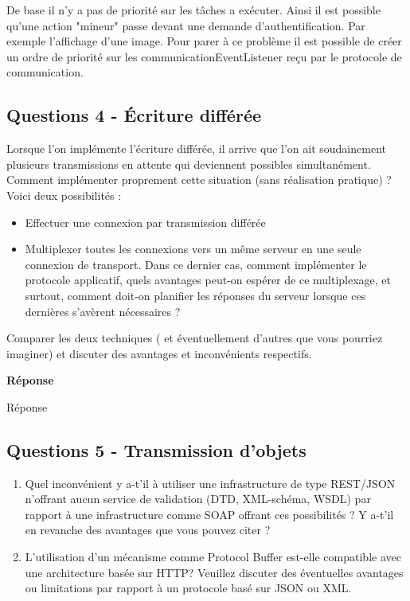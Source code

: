 \documentclass[francais,12pt]{article}
\begin{document}
	De base il n'y a pas de priorité sur les tâches a exécuter. Ainsi il est possible qu'une action "mineur" passe devant une demande d'authentification. Par exemple l'affichage d'une image. Pour parer à ce problème il est possible de créer un ordre de priorité sur les communicationEventListener reçu par le protocole de communication. 
	
	\subsection*{Questions 4 - Écriture différée}    
	Lorsque l'on implémente l'écriture différée, il arrive que l'on ait soudainement plusieurs transmissions en attente qui deviennent possibles simultanément. Comment implémenter proprement cette situation (sans réalisation pratique) ? Voici deux possibilités :
	\begin{itemize}
		\item Effectuer une connexion par transmission différée
		\item Multiplexer toutes les connexions vers un même serveur en une seule connexion de transport. Dans ce dernier cas, comment implémenter le protocole applicatif, quels avantages peut-on espérer de ce multiplexage, et surtout, comment doit-on planifier les réponses du serveur lorsque ces dernières s'avèrent nécessaires ?
	\end{itemize}
	
	Comparer les deux techniques ( et éventuellement d'autres que vous pourriez imaginer) et discuter des avantages et inconvénients respectifs.
	
	{\color[rgb]{0,0.5,0.23}\textbf{Réponse}}
	
	Réponse
	
	
	\subsection*{Questions 5 - Transmission d'objets}  
	\begin{enumerate}
		\item Quel inconvénient y a-t'il à utiliser une infrastructure de type REST/JSON n'offrant aucun service de validation (DTD, XML-schéma, WSDL) par rapport à une infrastructure comme SOAP offrant ces possibilités ? Y a-t'il en revanche des avantages que vous pouvez citer ?
		\item L'utilisation d'un mécanisme comme Protocol Buffer est-elle compatible avec une architecture basée sur HTTP? Veuillez discuter des éventuelles avantages ou limitations par rapport à un protocole basé sur JSON ou XML.
	\end{enumerate} 
	
\end{document}
